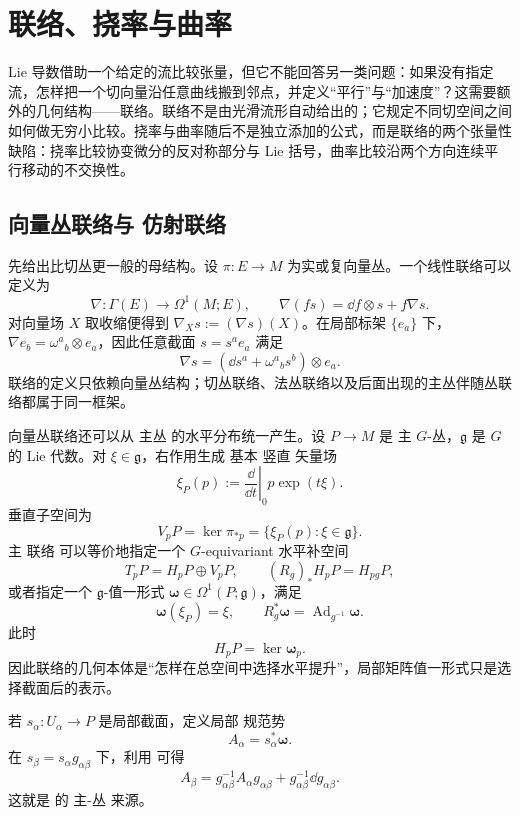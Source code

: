 \chapter{联络、挠率与曲率}
\label{chap:ghs-manifold-connection}
\label{chap:ghs-geometry-foliation}

Lie 导数借助一个给定的流比较张量，但它不能回答另一类问题：如果没有指定流，怎样把一个切向量沿任意曲线搬到邻点，并定义“平行”与“加速度”？这需要额外的几何结构——联络。联络不是由光滑流形自动给出的；它规定不同切空间之间如何做无穷小比较。挠率与曲率随后不是独立添加的公式，而是联络的两个张量性缺陷：挠率比较协变微分的反对称部分与 Lie 括号，曲率比较沿两个方向连续平行移动的不交换性。

\section{向量丛联络与 仿射联络}
先给出比切丛更一般的母结构。设 $\pi:E\to M$ 为实或复向量丛。一个线性联络可以定义为
\begin{equation*}\nabla:\Gamma(E)\longrightarrow\Omega^1(M;E),
\qquad
\nabla(fs)=\dd f\otimes s+f\nabla s.
\end{equation*}
对向量场 $X$ 取收缩便得到 $\nabla_Xs:=(\nabla s)(X)$。在局部标架 $\{e_a\}$ 下，$\nabla e_b=\omega^a{}_b\otimes e_a$，因此任意截面 $s=s^ae_a$ 满足
\[
\nabla s=(\dd s^a+\omega^a{}_b s^b)\otimes e_a.
\]
联络的定义只依赖向量丛结构；切丛联络、法丛联络以及后面出现的主丛伴随丛联络都属于同一框架。

向量丛联络还可以从 主丛 的水平分布统一产生。设 $P\to M$ 是 主 $G$-丛，$\mathfrak g$ 是 $G$ 的 Lie 代数。对 $\xi\in\mathfrak g$，右作用生成 基本 竖直 矢量场
\[
\xi_P(p)
:=\left.\frac{\dd}{\dd t}\right|_0p\exp(t\xi).
\]
垂直子空间为
\[
V_pP=\ker\pi_{*p}
=\{\xi_P(p):\xi\in\mathfrak g\}.
\]
主 联络 可以等价地指定一个 $G$-equivariant 水平补空间
\begin{equation*}T_pP=H_pP\oplus V_pP,
\qquad
(R_g)_*H_pP=H_{pg}P,\end{equation*}
或者指定一个 $\mathfrak g$-值一形式 $\boldsymbol\omega\in\Omega^1(P;\mathfrak g)$，满足
\begin{equation}
\boldsymbol\omega(\xi_P)=\xi,
\qquad
R_g^*\boldsymbol\omega
=\operatorname{Ad}_{g^{-1}}\boldsymbol\omega.
\label{eq:principal-connection-form}
\end{equation}
此时
\[
H_pP=\ker\boldsymbol\omega_p.
\]
因此联络的几何本体是“怎样在总空间中选择水平提升”，局部矩阵值一形式只是选择截面后的表示。

若 $s_\alpha:U_\alpha\to P$ 是局部截面，定义局部 规范势
\[
A_\alpha=s_\alpha^*\boldsymbol\omega.
\]
在 $s_\beta=s_\alpha g_{\alpha\beta}$ 下，利用 可得
\begin{equation}
A_\beta
=g_{\alpha\beta}^{-1}A_\alpha g_{\alpha\beta}
+g_{\alpha\beta}^{-1}\dd g_{\alpha\beta}.
\label{eq:principal-local-connection-transform}
\end{equation}
这就是 的 主-丛 来源。

